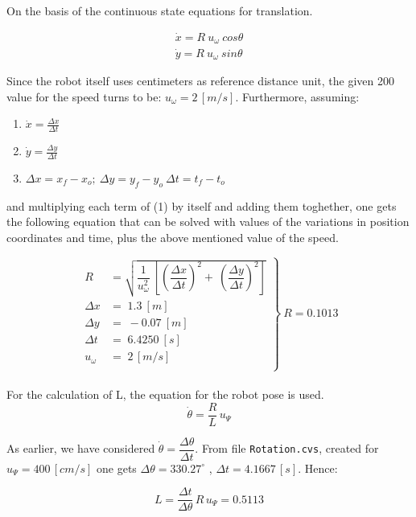 On the basis of the continuous state equations for translation.

\begin{equation}
\begin{array}{ccc}
  \dot{x} = R\:u_{\omega}\:cos\theta \\

  \dot{y} = R\:u_{\omega}\:sin\theta
\end{array}
\end{equation}


Since the robot itself uses centimeters as reference distance unit, the  given
200 value for the speed turns to be: $u_{\omega} = 2\,[m/s]$. Furthermore,
assuming:

 \begin{enumerate}
 \item $ \dot{x} = \frac{\Delta x}{\Delta t}$
 \item $ \dot{y} = \frac{\Delta y}{\Delta t}$
 \item $\Delta x = x_{f} - x_{o};\ \Delta y = y_{f} - y_{o}\ \Delta t = t_{f} - t_{o}$
 \end{enumerate}

 and multiplying each term of (1) by itself and adding them toghether,
 one gets the following equation  that can be solved with values of the
 variations in position coordinates and time, plus the above mentioned value of
 the speed.

\begin{equation*}
 \left.
  \begin{array}{ll}
    R &= \sqrt{\dfrac{1}{u_{\omega}^{2}}\:\left[ \left( \dfrac{\Delta x}{\Delta t}\right)^2 + \:\left( \dfrac{\Delta y}{\Delta t}\right)^2 \right]} \\
    \Delta x &= \;1.3\:[m] \\
    \Delta y &=\;-0.07\:[m] \\
    \Delta t &=\;6.4250\:[s] \\
    u_{\omega} &=\;2\,[m/s] \\
\end{array}
\right\}\:R = 0.1013
 \end{equation*} \\

For the calculation of L, the equation for the robot pose is used.
$$\dot{\theta} = \dfrac{R}{L}\,u_{\Psi}$$

As earlier, we have considered $\dot{\theta} = \dfrac{\Delta \theta}{\Delta t}$.
From file \texttt{Rotation.cvs}, created for $u_{\Psi} = 400\,[cm/s]$ one gets
$\Delta\theta = 330.27^{\circ}$ , $\Delta t = 4.1667\,[s]$. Hence:

$$L = \dfrac{\Delta t}{\Delta \theta}\,R\,u_{\Psi} = 0.5113$$
